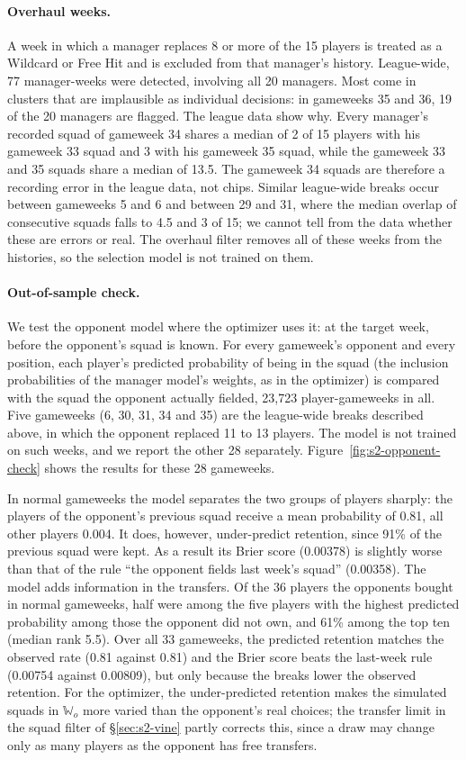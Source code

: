 \documentclass[12pt,oneside,a4paper]{book}
\theoremstyle{definition}
\theoremstyle{remark}
\begin{document}
	\paragraph{Overhaul weeks.} A week in which a manager replaces 8 or more of the 15 players is
	treated as a Wildcard or Free Hit and is excluded from that manager's history. League-wide, 77
	manager-weeks were detected, involving all 20 managers. Most come in clusters that are
	implausible as individual decisions: in gameweeks 35 and 36, 19 of the 20 managers are flagged.
	The league data show why. Every manager's recorded squad of gameweek 34 shares a median of 2 of
	15 players with his gameweek 33 squad and 3 with his gameweek 35 squad, while the gameweek 33 and
	35 squads share a median of 13.5. The gameweek 34 squads are therefore a recording error in
	the league data, not chips. Similar league-wide breaks occur between gameweeks 5 and 6 and
	between 29 and 31, where the median overlap of consecutive squads falls to 4.5 and 3 of 15; we
	cannot tell from the data whether these are errors or real. The overhaul filter removes all
	of these weeks from the histories, so the selection model is not trained on them.

	\paragraph{Out-of-sample check.} We test the opponent model where the optimizer uses it: at the
	target week, before the opponent's squad is known. For every gameweek's opponent and every
	position, each player's predicted probability of being in the squad (the inclusion probabilities
	of the manager model's weights, as in the optimizer) is compared with the squad the opponent
	actually fielded, 23{,}723 player-gameweeks in all. Five gameweeks (6, 30, 31, 34 and 35) are
	the league-wide breaks described above, in which the opponent replaced 11 to 13 players. The model
	is not trained on such weeks, and we report the other 28 separately. Figure~\ref{fig:s2-opponent-check}
	shows the results for these 28 gameweeks.

	In normal gameweeks the model separates the two groups of players sharply: the players of the
	opponent's previous squad receive a mean probability of 0.81, all other players 0.004. It does,
	however, under-predict retention, since 91\% of the previous squad were kept. As a result its
	Brier score (0.00378) is slightly worse than that of the rule ``the opponent fields last week's
	squad'' (0.00358). The model adds information in the transfers. Of the 36 players the opponents
	bought in normal gameweeks, half were among the five players with the highest predicted
	probability among those the opponent did not own, and 61\% among the top ten (median rank 5.5).
	Over all 33 gameweeks, the predicted retention matches the observed rate (0.81 against 0.81) and
	the Brier score beats the last-week rule (0.00754 against 0.00809), but only because the breaks
	lower the observed retention. For the optimizer, the under-predicted retention makes the
	simulated squads in $\mathbb{W}_o$ more varied than the opponent's real choices; the transfer
	limit in the squad filter of \S\ref{sec:s2-vine} partly corrects this, since a draw may change
	only as many players as the opponent has free transfers.
\end{document}
